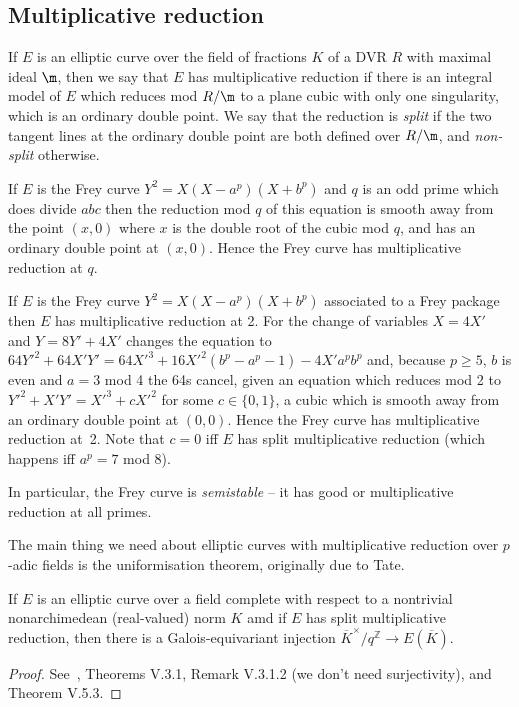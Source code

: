 \begin{corollary}
\section{Multiplicative reduction}

If $E$ is an elliptic curve over the field of fractions $K$ of a DVR $R$ with maximal ideal $\m$,
then we say that $E$ has multiplicative reduction if there is an integral model of $E$
which reduces mod $R/\m$ to a plane cubic with only one singularity, which is an ordinary double point.
We say that the reduction is \emph{split} if the two tangent lines at the ordinary double point
are both defined over $R/\m$, and \emph{non-split} otherwise.

\begin{example} If $E$ is the Frey curve $Y^2=X(X-a^p)(X+b^p)$ and $q$ is an odd prime
  which does divide $abc$ then the reduction mod $q$ of this equation is smooth
  away from the point $(x,0)$ where $x$ is the double root of the cubic mod $q$,
  and has an ordinary double point at $(x,0)$. Hence the Frey curve has
  multiplicative reduction at $q$.
\end{example}

\begin{example} If $E$ is the Frey curve $Y^2=X(X-a^p)(X+b^p)$ associated to a Frey package
  then $E$ has multiplicative reduction at 2. For the change of variables $X=4X'$ and $Y=8Y'+4X'$
  changes the equation to $64Y'^2+64X'Y'=64X'^3+16X'^2(b^p-a^p-1)-4X'a^pb^p$ and, because $p\geq5$,
  $b$ is even and $a=3$ mod 4 the 64s cancel, given an equation which reduces mod 2 to
  $Y'^2+X'Y'=X'^3+cX'^2$ for some $c\in\{0,1\}$, a cubic which is smooth away from an ordinary 
  double point at $(0,0)$. Hence the Frey curve has multiplicative reduction at~2. Note
  that $c=0$ iff $E$ has split multiplicative reduction (which happens iff $a^p=7$ mod $8$).
\end{example}

In particular, the Frey curve is \emph{semistable} -- it has good or multiplicative
reduction at all primes.

The main thing we need about elliptic curves with multiplicative reduction over $p$-adic fields
is the uniformisation theorem, originally due to Tate. 

\begin{theorem}\label{Tate_curve_uniformisation} If $E$ is an elliptic curve over a field
  complete with respect to a nontrivial nonarchimedean (real-valued) norm $K$ amd if $E$ has split
  multiplicative reduction, then there is a Galois-equivariant injection
  $\overline{K}^\times/q^{\mathbb{Z}}\to E(\overline{K})$.
\end{theorem}
\begin{proof}
  See~\cite{silverman2}, Theorems V.3.1, Remark V.3.1.2 (we don't need surjectivity),
  and Theorem V.5.3.
\end{proof}


\end{corollary}
